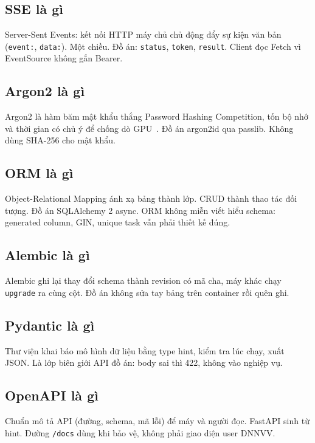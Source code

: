 \subsection{SSE là gì}

Server-Sent Events: kết nối HTTP máy chủ chủ động đẩy sự kiện văn bản
(\texttt{event:}, \texttt{data:}). Một chiều. Đồ án: \texttt{status},
\texttt{token}, \texttt{result}. Client đọc Fetch vì EventSource không gắn Bearer.

\subsection{Argon2 là gì}

Argon2 là hàm băm mật khẩu thắng Password Hashing Competition, tốn bộ nhớ và
thời gian có chủ ý để chống dò GPU~\cite{argon2}. Đồ án argon2id qua passlib.
Không dùng SHA-256 cho mật khẩu.

\subsection{ORM là gì}

Object-Relational Mapping ánh xạ bảng thành lớp. CRUD thành thao tác đối tượng.
Đồ án SQLAlchemy 2 async. ORM không miễn viết hiểu schema: generated column,
GIN, unique task vẫn phải thiết kế đúng.

\subsection{Alembic là gì}

Alembic ghi lại thay đổi schema thành revision có mã cha, máy khác chạy
\texttt{upgrade} ra cùng cột. Đồ án không sửa tay bảng trên container rồi quên
ghi.

\subsection{Pydantic là gì}

Thư viện khai báo mô hình dữ liệu bằng type hint, kiểm tra lúc chạy, xuất JSON.
Là lớp biên giới API đồ án: body sai thì 422, không vào nghiệp vụ.

\subsection{OpenAPI là gì}

Chuẩn mô tả API (đường, schema, mã lỗi) để máy và người đọc. FastAPI sinh từ
hint. Đường \texttt{/docs} dùng khi bảo vệ, không phải giao diện user DNNVV.

